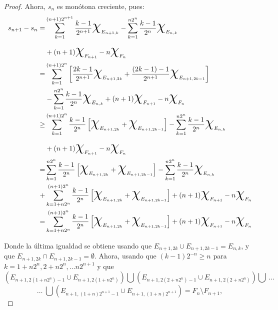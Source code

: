 \begin{proof}
  Ahora, ${s_n}$ es monótona creciente, pues:
      \begin{align*}
 s_{n+1}-s_n =&  \sum_{k=1}^{(n+1)2^{n+1}} \frac{k-1}{2^{n+1}} \text{\huge $\chi$}_{E_{n+1,k}}
				- \sum_{k=1}^{n2^n} \frac{k-1}{2^n} \text{\huge $\chi$}_{E_{n,k}}
				\\
			&+	(n+1) \text{\huge{$\chi$}}_{F_{n+1}} - n \text{\huge{$\chi$}}_{F_n}
				\\ %
			=& \sum_{k=1}^{(n+1)2^{n}} \left[ \frac{2k-1}{2^{n+1}} \text{\huge $\chi$}_{E_{n+1,2k}}
									+ \frac{(2k-1)-1}{2^{n+1}} \text{\huge $\chi$}_{E_{n+1,2k-1}}  \right]
									\\
			&
				- \sum_{k=1}^{n2^n} \frac{k-1}{2^n} \text{\huge $\chi$}_{E_{n,k}}
				+	(n+1) \text{\huge{$\chi$}}_{F_{n+1}} - n \text{\huge{$\chi$}}_{F_n}
				\\
			\geq& \sum_{k=1}^{(n+1)2^{n}} \frac{k-1}{2^{n}} \left[  \text{\huge $\chi$}_{E_{n+1,2k}}
									+ \text{\huge $\chi$}_{E_{n+1,2k-1}}  \right]
				- \sum_{k=1}^{n2^n} \frac{k-1}{2^n} \text{\huge $\chi$}_{E_{n,k}}
				\\
				&+	(n+1) \text{\huge{$\chi$}}_{F_{n+1}} - n \text{\huge{$\chi$}}_{F_n}
				\\
				=& \sum_{k=1}^{n2^{n}} \frac{k-1}{2^{n}} \left[  \text{\huge $\chi$}_{E_{n+1,2k}}
									+ \text{\huge $\chi$}_{E_{n+1,2k-1}}  \right]
				- \sum_{k=1}^{n2^n} \frac{k-1}{2^n} \text{\huge $\chi$}_{E_{n,k}}
				\\
				+&\sum_{k=1+n 2^n}^{(n+1)2^{n}} \frac{k-1}{2^{n}} \left[  \text{\huge $\chi$}_{E_{n+1,2k}}
									+ \text{\huge $\chi$}_{E_{n+1,2k-1}}  \right]
				+	(n+1) \text{\huge{$\chi$}}_{F_{n+1}} - n \text{\huge{$\chi$}}_{F_n}
                                \\
                                = & \sum_{k=1+n 2^n}^{(n+1)2^{n}} \frac{k-1}{2^{n}} \left[  \text{\huge $\chi$}_{E_{n+1,2k}}
									+ \text{\huge $\chi$}_{E_{n+1,2k-1}}  \right]
				+	(n+1) \text{\huge{$\chi$}}_{F_{n+1}} - n \text{\huge{$\chi$}}_{F_n}
 \end{align*}

Donde la última igualdad se obtiene usando que $E_{n+1, 2k} \cup E_{n+1, 2k-1}=E_{n,k}$, y que $E_{n+1, 2k} \cap E_{n+1, 2k-1}= \emptyset$. Ahora, usando que $(k-1)2^{-n} \geq n$ para $k=1+n 2^n, 2+n 2^n,\dots n 2^{n+1}$ y que
\[
 \left( E_{n+1, 2(1+n2^n)-1} \cup E_{n+1, 2(1+n2^n)}  \right)
 \bigcup
 \left(E_{n+1, 2(2+n2^n)-1} \cup E_{n+1, 2(2+n2^n)} \right)
 \bigcup \
 \dots
\]
\[
 \dots \
 \bigcup
 \left( E_{n+1, (1+n)2^{n+1}-1} \cup E_{n+1, (1+n)2^{n+1}} \right)
 =F_{n} \setminus F_{n+1},
\]


\end{proof}
